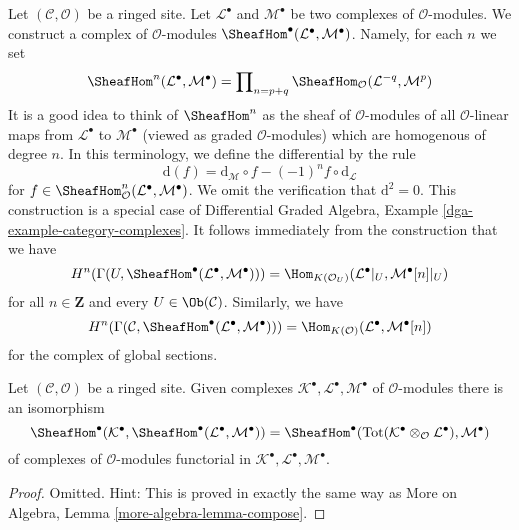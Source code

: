 \noindent
Let $(\mathcal{C}, \mathcal{O})$ be a ringed site. Let
$\mathcal{L}^\bullet$ and $\mathcal{M}^\bullet$ be two complexes
of $\mathcal{O}$-modules. We construct a complex
of $\mathcal{O}$-modules
$\SheafHom^\bullet(\mathcal{L}^\bullet, \mathcal{M}^\bullet)$.
Namely, for each $n$ we set
$$
\SheafHom^n(\mathcal{L}^\bullet, \mathcal{M}^\bullet) =
\prod\nolimits_{n = p + q}
\SheafHom_\mathcal{O}(\mathcal{L}^{-q}, \mathcal{M}^p)
$$
It is a good idea to think of $\SheafHom^n$ as the
sheaf of $\mathcal{O}$-modules of all $\mathcal{O}$-linear
maps from $\mathcal{L}^\bullet$ to $\mathcal{M}^\bullet$
(viewed as graded $\mathcal{O}$-modules) which are homogenous
of degree $n$. In this terminology, we define the differential by the rule
$$
\text{d}(f) =
\text{d}_\mathcal{M} \circ f - (-1)^n f \circ \text{d}_\mathcal{L}
$$
for
$f \in \SheafHom^n_\mathcal{O}(\mathcal{L}^\bullet, \mathcal{M}^\bullet)$.
We omit the verification that $\text{d}^2 = 0$.
This construction is a special case of
Differential Graded Algebra, Example \ref{dga-example-category-complexes}.
It follows immediately from the construction that we have
\begin{equation}
\label{equation-cohomology-hom-complex}
H^n(\Gamma(U, \SheafHom^\bullet(\mathcal{L}^\bullet, \mathcal{M}^\bullet))) =
\Hom_{K(\mathcal{O}_U)}(\mathcal{L}^\bullet|_U, \mathcal{M}^\bullet[n]|_U)
\end{equation}
for all $n \in \mathbf{Z}$ and every $U \in \Ob(\mathcal{C})$. Similarly,
we have
\begin{equation}
\label{equation-global-cohomology-hom-complex}
H^n(\Gamma(\mathcal{C},
\SheafHom^\bullet(\mathcal{L}^\bullet, \mathcal{M}^\bullet))) =
\Hom_{K(\mathcal{O})}(\mathcal{L}^\bullet, \mathcal{M}^\bullet[n])
\end{equation}
for the complex of global sections.

\begin{lemma}
\label{lemma-compose}
Let $(\mathcal{C}, \mathcal{O})$ be a ringed site.
Given complexes $\mathcal{K}^\bullet, \mathcal{L}^\bullet, \mathcal{M}^\bullet$
of $\mathcal{O}$-modules there is an isomorphism
$$
\SheafHom^\bullet(\mathcal{K}^\bullet,
\SheafHom^\bullet(\mathcal{L}^\bullet, \mathcal{M}^\bullet))
=
\SheafHom^\bullet(\text{Tot}(\mathcal{K}^\bullet \otimes_\mathcal{O}
\mathcal{L}^\bullet), \mathcal{M}^\bullet)
$$
of complexes of $\mathcal{O}$-modules functorial in
$\mathcal{K}^\bullet, \mathcal{L}^\bullet, \mathcal{M}^\bullet$.
\end{lemma}

\begin{proof}
Omitted. Hint: This is proved in exactly the same way as
More on Algebra, Lemma \ref{more-algebra-lemma-compose}.
\end{proof}

